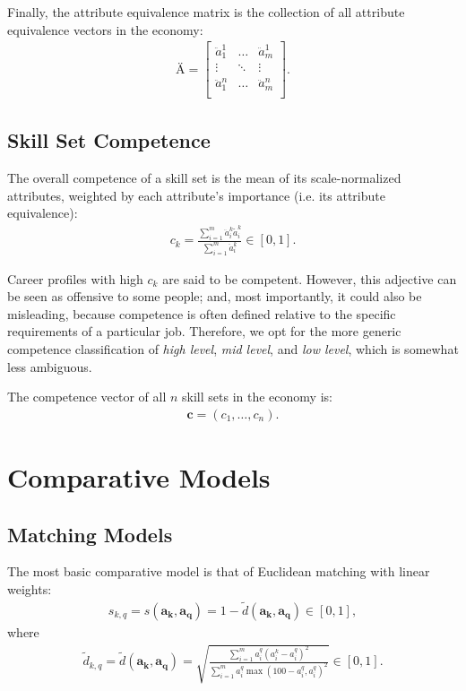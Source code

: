 \documentclass{elsarticle} %
\begin{document}
Finally, the attribute equivalence matrix is the collection of all attribute
equivalence vectors in the economy:
\begin{gather}
    \textbf{Ä} =
    \begin{bmatrix}
        \ddot{a}_{1}^{1} & \hdots & \ddot{a}_{m}^{1} \\
        \vdots           & \ddots & \vdots           \\
        \ddot{a}_{1}^{n} & \hdots & \ddot{a}_{m}^{n} \\
    \end{bmatrix}
    .
\end{gather}

\subsection{Skill Set Competence}
The overall competence of a skill set is the mean of its scale-normalized
attributes, weighted by each attribute's importance (i.e. its attribute
equivalence):
\begin{gather}
    c_k =
    \frac{
    \sum_{i=1}^{m}{
    \ddot{a}_{i}^{k}
    \tilde{a}_{i}^{k}
    }
    }{
    \sum_{i=1}^{m}{
    \ddot{a}_{i}^{k}
    }
    }
    \in [0,1]
    .
\end{gather}

Career profiles with high $c_k$ are said to be competent. However, this
adjective can be seen as offensive to some people; and, most importantly, it
could also be misleading, because competence is often defined relative to the
specific requirements of a particular job. Therefore, we opt for the more
generic competence classification of \textit{high level}, \textit{mid level},
and \textit{low level}, which is somewhat less ambiguous.

The competence vector of all $n$ skill sets in the economy is:
\begin{gather}
    \boldsymbol{c} = (c_1, \dots, c_n)
    .
\end{gather}


\section{Comparative Models}
\subsection{Matching Models}
The most basic comparative model is that of Euclidean matching with linear
weights:
\begin{gather}
    s_{k,q} =
    s(\boldsymbol{a_k}, \boldsymbol{a_q}) =
    1 - \tilde{d}(\boldsymbol{a_k}, \boldsymbol{a_q})
    \in [0,1]
    ,
\end{gather}
where
\begin{gather}
    \tilde{d}_{k,q} =
    \tilde{d}(\boldsymbol{a_k}, \boldsymbol{a_q}) =
    \sqrt{
    \frac{
    \sum_{i = 1}^{m}{
    a_{i}^{q} (a_{i}^{k} - a_{i}^{q})^2
    }
    }{
    \sum_{i = 1}^{m}{
    a_{i}^{q} \max(100 - a_{i}^{q}, a_{i}^{q})^2
    }
    }
    }
    \in [0,1]
    .
\end{gather}
\end{document}
